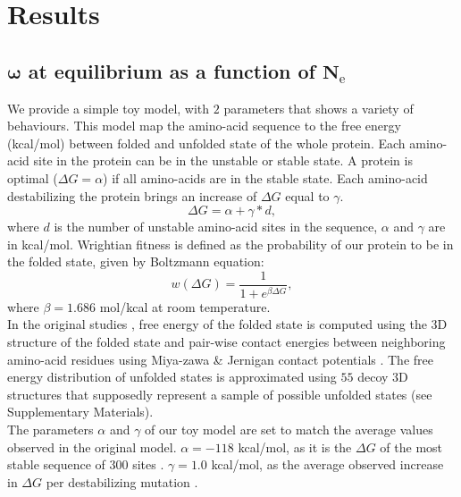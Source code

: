 \documentclass{article}
\newcommand{\Ne}{N_{\mathrm{e}}}
\newcommand{\dnds}{\omega}
\newcommand{\phenoFold}{\Delta G}
\newcommand{\phenoFoldMin}{\alpha}
\newcommand{\dphenoFold}{\gamma}
\begin{document}
\section{Results}
\subsection{$\bm{\dnds}$ at equilibrium as a function of $\bm{\Ne}$}

We provide a simple toy model, with $2$ parameters that shows a variety of behaviours. 
This model map the amino-acid sequence to the free energy (kcal/mol) between folded and unfolded state of the whole protein.
Each amino-acid site in the protein can be in the unstable or stable state.
A protein is optimal ($\phenoFold = \phenoFoldMin$) if all amino-acids are in the stable state.
Each amino-acid destabilizing the protein brings an increase of $\phenoFold$ equal to $\dphenoFold$.
\begin{equation}
\phenoFold = \phenoFoldMin + \dphenoFold * d, 
\end{equation}
where $d$ is the number of unstable amino-acid sites in the sequence, $\alpha$ and $\gamma$ are in kcal/mol.
Wrightian fitness is defined as the probability of our protein to be in the folded state, given by Boltzmann equation: 
\begin{equation}
w(\phenoFold) = \dfrac{1}{1 + e^{\beta \phenoFold }}, 
\end{equation}
where $\beta=1.686$ mol/kcal at room temperature.\\

In the original studies \cite{Williams2006, Goldstein2011, Pollock2012}, free energy of the folded state is computed using the $3$D structure of the folded state and pair-wise contact energies between neighboring amino-acid residues using Miya-zawa \& Jernigan contact potentials \cite{Miyazawa1985}.
The free energy distribution of unfolded states is approximated using $55$ decoy $3$D structures that supposedly represent a sample of possible unfolded states (see Supplementary Materials).\\

The parameters $\alpha$ and $\gamma$ of our toy model are set to match the average values observed in the original model.
$\alpha=-118$ kcal/mol, as it is the $\phenoFold$ of the most stable sequence of $300$ sites \cite{Goldstein2011}.
$\gamma=1.0$ kcal/mol, as the average observed increase in $\phenoFold$ per destabilizing mutation \cite{Zeldovich2007}.
\end{document}

